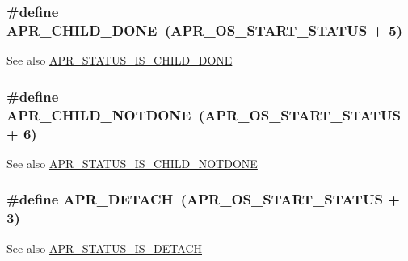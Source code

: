\subsubsection[{\texorpdfstring{A\+P\+R\+\_\+\+C\+H\+I\+L\+D\+\_\+\+D\+O\+NE}{APR_CHILD_DONE}}]{\setlength{\rightskip}{0pt plus 5cm}\#define A\+P\+R\+\_\+\+C\+H\+I\+L\+D\+\_\+\+D\+O\+NE~({\bf A\+P\+R\+\_\+\+O\+S\+\_\+\+S\+T\+A\+R\+T\+\_\+\+S\+T\+A\+T\+US} + 5)}\hypertarget{group__APR__Error_ga2a78375cab66b8c1a4e06329e0cfcaf4}{}\label{group__APR__Error_ga2a78375cab66b8c1a4e06329e0cfcaf4}
\begin{DoxySeeAlso}{See also}
\hyperlink{group__APR__STATUS__IS_ga1e6539dfa172cef4026105ca33b2b208}{A\+P\+R\+\_\+\+S\+T\+A\+T\+U\+S\+\_\+\+I\+S\+\_\+\+C\+H\+I\+L\+D\+\_\+\+D\+O\+NE} 
\end{DoxySeeAlso}
\subsubsection[{\texorpdfstring{A\+P\+R\+\_\+\+C\+H\+I\+L\+D\+\_\+\+N\+O\+T\+D\+O\+NE}{APR_CHILD_NOTDONE}}]{\setlength{\rightskip}{0pt plus 5cm}\#define A\+P\+R\+\_\+\+C\+H\+I\+L\+D\+\_\+\+N\+O\+T\+D\+O\+NE~({\bf A\+P\+R\+\_\+\+O\+S\+\_\+\+S\+T\+A\+R\+T\+\_\+\+S\+T\+A\+T\+US} + 6)}\hypertarget{group__APR__Error_ga00bba31c29774cce3e72a31f88610340}{}\label{group__APR__Error_ga00bba31c29774cce3e72a31f88610340}
\begin{DoxySeeAlso}{See also}
\hyperlink{group__APR__STATUS__IS_ga86190a4a2c04bbbbedc2491bb93ab432}{A\+P\+R\+\_\+\+S\+T\+A\+T\+U\+S\+\_\+\+I\+S\+\_\+\+C\+H\+I\+L\+D\+\_\+\+N\+O\+T\+D\+O\+NE} 
\end{DoxySeeAlso}
\subsubsection[{\texorpdfstring{A\+P\+R\+\_\+\+D\+E\+T\+A\+CH}{APR_DETACH}}]{\setlength{\rightskip}{0pt plus 5cm}\#define A\+P\+R\+\_\+\+D\+E\+T\+A\+CH~({\bf A\+P\+R\+\_\+\+O\+S\+\_\+\+S\+T\+A\+R\+T\+\_\+\+S\+T\+A\+T\+US} + 3)}\hypertarget{group__APR__Error_gab3f8849983a52f6558016303fb4f5cff}{}\label{group__APR__Error_gab3f8849983a52f6558016303fb4f5cff}
\begin{DoxySeeAlso}{See also}
\hyperlink{group__APR__STATUS__IS_ga64d5d0a6bfe141a387dfdd430a38465b}{A\+P\+R\+\_\+\+S\+T\+A\+T\+U\+S\+\_\+\+I\+S\+\_\+\+D\+E\+T\+A\+CH} 
\end{DoxySeeAlso}

